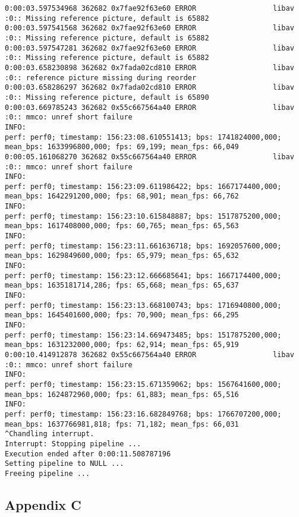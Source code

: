 \documentclass[12pt,oneside]{book}
\begin{document}
\begin{lstlisting}
0:00:03.597534968 362682 0x7fae92f63e60 ERROR                  libav :0:: Missing reference picture, default is 65882
0:00:03.597541568 362682 0x7fae92f63e60 ERROR                  libav :0:: Missing reference picture, default is 65882
0:00:03.597547281 362682 0x7fae92f63e60 ERROR                  libav :0:: Missing reference picture, default is 65882
0:00:03.658230898 362682 0x7fada02cd810 ERROR                  libav :0:: reference picture missing during reorder
0:00:03.658286297 362682 0x7fada02cd810 ERROR                  libav :0:: Missing reference picture, default is 65890
0:00:03.669785243 362682 0x55c667564a40 ERROR                  libav :0:: mmco: unref short failure
INFO:
perf: perf0; timestamp: 156:23:08.610551413; bps: 1741824000,000; mean_bps: 1633996800,000; fps: 69,199; mean_fps: 66,049
0:00:05.161068270 362682 0x55c667564a40 ERROR                  libav :0:: mmco: unref short failure
INFO:
perf: perf0; timestamp: 156:23:09.611986422; bps: 1667174400,000; mean_bps: 1642291200,000; fps: 68,901; mean_fps: 66,762
INFO:
perf: perf0; timestamp: 156:23:10.615848887; bps: 1517875200,000; mean_bps: 1617408000,000; fps: 60,765; mean_fps: 65,563
INFO:
perf: perf0; timestamp: 156:23:11.661636718; bps: 1692057600,000; mean_bps: 1629849600,000; fps: 65,979; mean_fps: 65,632
INFO:
perf: perf0; timestamp: 156:23:12.666685641; bps: 1667174400,000; mean_bps: 1635181714,286; fps: 65,668; mean_fps: 65,637
INFO:
perf: perf0; timestamp: 156:23:13.668100743; bps: 1716940800,000; mean_bps: 1645401600,000; fps: 70,900; mean_fps: 66,295
INFO:
perf: perf0; timestamp: 156:23:14.669473485; bps: 1517875200,000; mean_bps: 1631232000,000; fps: 62,914; mean_fps: 65,919
0:00:10.414912878 362682 0x55c667564a40 ERROR                  libav :0:: mmco: unref short failure
INFO:
perf: perf0; timestamp: 156:23:15.671359062; bps: 1567641600,000; mean_bps: 1624872960,000; fps: 61,883; mean_fps: 65,516
INFO:
perf: perf0; timestamp: 156:23:16.682849768; bps: 1766707200,000; mean_bps: 1637766981,818; fps: 71,182; mean_fps: 66,031
^Chandling interrupt.
Interrupt: Stopping pipeline ...
Execution ended after 0:00:11.508787196
Setting pipeline to NULL ...
Freeing pipeline ...
\end{lstlisting}

\subsection*{Appendix C}
\end{document}
